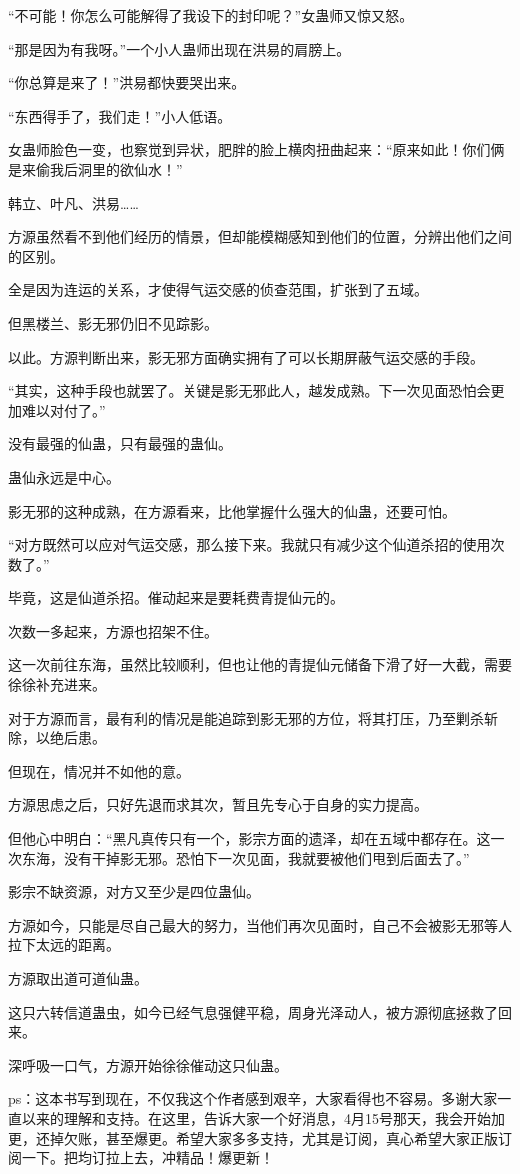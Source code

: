 \begin{this_body}
“不可能！你怎么可能解得了我设下的封印呢？”女蛊师又惊又怒。

“那是因为有我呀。”一个小人蛊师出现在洪易的肩膀上。

“你总算是来了！”洪易都快要哭出来。

“东西得手了，我们走！”小人低语。

女蛊师脸色一变，也察觉到异状，肥胖的脸上横肉扭曲起来：“原来如此！你们俩是来偷我后洞里的欲仙水！”

韩立、叶凡、洪易……

方源虽然看不到他们经历的情景，但却能模糊感知到他们的位置，分辨出他们之间的区别。

全是因为连运的关系，才使得气运交感的侦查范围，扩张到了五域。

但黑楼兰、影无邪仍旧不见踪影。

以此。方源判断出来，影无邪方面确实拥有了可以长期屏蔽气运交感的手段。

“其实，这种手段也就罢了。关键是影无邪此人，越发成熟。下一次见面恐怕会更加难以对付了。”

没有最强的仙蛊，只有最强的蛊仙。

蛊仙永远是中心。

影无邪的这种成熟，在方源看来，比他掌握什么强大的仙蛊，还要可怕。

“对方既然可以应对气运交感，那么接下来。我就只有减少这个仙道杀招的使用次数了。”

毕竟，这是仙道杀招。催动起来是要耗费青提仙元的。

次数一多起来，方源也招架不住。

这一次前往东海，虽然比较顺利，但也让他的青提仙元储备下滑了好一大截，需要徐徐补充进来。

对于方源而言，最有利的情况是能追踪到影无邪的方位，将其打压，乃至剿杀斩除，以绝后患。

但现在，情况并不如他的意。

方源思虑之后，只好先退而求其次，暂且先专心于自身的实力提高。

但他心中明白：“黑凡真传只有一个，影宗方面的遗泽，却在五域中都存在。这一次东海，没有干掉影无邪。恐怕下一次见面，我就要被他们甩到后面去了。”

影宗不缺资源，对方又至少是四位蛊仙。

方源如今，只能是尽自己最大的努力，当他们再次见面时，自己不会被影无邪等人拉下太远的距离。

方源取出道可道仙蛊。

这只六转信道蛊虫，如今已经气息强健平稳，周身光泽动人，被方源彻底拯救了回来。

深呼吸一口气，方源开始徐徐催动这只仙蛊。

ps：这本书写到现在，不仅我这个作者感到艰辛，大家看得也不容易。多谢大家一直以来的理解和支持。在这里，告诉大家一个好消息，4月15号那天，我会开始加更，还掉欠账，甚至爆更。希望大家多多支持，尤其是订阅，真心希望大家正版订阅一下。把均订拉上去，冲精品！爆更新！

\end{this_body}

